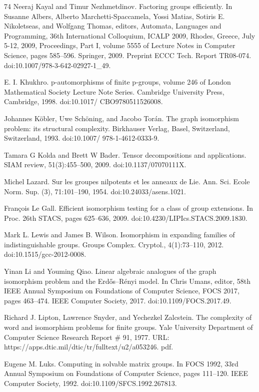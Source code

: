 \documentclass[10pt,a4paper]{article}
\begin{document}
\begin{thebibliography}{74}
Neeraj Kayal and Timur Nezhmetdinov. Factoring groups efficiently. In Susanne Albers, Alberto Marchetti-Spaccamela, Yossi Matias, Sotiris E. Nikoletseas, and Wolfgang Thomas, editors, Automata, Languages and Programming, 36th International Colloquium, ICALP 2009, Rhodes, Greece, July 5-12, 2009, Proceedings, Part I, volume 5555 of Lecture Notes in Computer Science, pages 585–596. Springer, 2009. Preprint ECCC Tech. Report TR08-074. doi:10.1007/978-3-642-02927-1\_49.

E. I. Khukhro. p-automorphisms of finite p-groups, volume 246 of London Mathematical Society Lecture Note Series. Cambridge University Press, Cambridge, 1998. doi:10.1017/ CBO9780511526008.

Johannes Köbler, Uwe Schöning, and Jacobo Torán. The graph isomorphism problem: its structural complexity. Birkhauser Verlag, Basel, Switzerland, Switzerland, 1993. doi:10.1007/ 978-1-4612-0333-9.

Tamara G Kolda and Brett W Bader. Tensor decompositions and applications. SIAM review, 51(3):455–500, 2009. doi:10.1137/07070111X.

Michel Lazard. Sur les groupes nilpotents et les anneaux de Lie. Ann. Sci. Ecole Norm. Sup. (3), 71:101–190, 1954. doi:10.24033/asens.1021.

François Le Gall. Efficient isomorphism testing for a class of group extensions. In Proc. 26th STACS, pages 625–636, 2009. doi:10.4230/LIPIcs.STACS.2009.1830.

Mark L. Lewis and James B. Wilson. Isomorphism in expanding families of indistinguishable groups. Groups Complex. Cryptol., 4(1):73–110, 2012. doi:10.1515/gcc-2012-0008.

Yinan Li and Youming Qiao. Linear algebraic analogues of the graph isomorphism problem and the Erdős–Rényi model. In Chris Umans, editor, 58th IEEE Annual Symposium on Foundations of Computer Science, FOCS 2017, pages 463–474. IEEE Computer Society, 2017. doi:10.1109/FOCS.2017.49.

Richard J. Lipton, Lawrence Snyder, and Yechezkel Zalcstein. The complexity of word and isomorphism problems for finite groups. Yale University Department of Computer Science Research Report \# 91, 1977. URL: https://apps.dtic.mil/dtic/tr/fulltext/u2/a053246. pdf.

Eugene M. Luks. Computing in solvable matrix groups. In FOCS 1992, 33rd Annual Symposium on Foundations of Computer Science, pages 111–120. IEEE Computer Society, 1992. doi:10.1109/SFCS.1992.267813.


\end{thebibliography}
\end{document}
